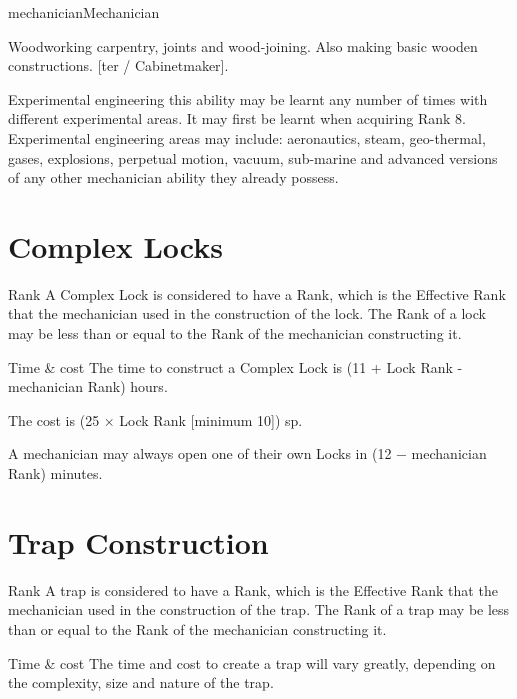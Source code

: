 \begin{Skill}[2.2]{mechanician}{Mechanician}
\begin{Description}
\item[Woodworking] carpentry, joints and wood-joining.  Also making
  basic wooden constructions. [ter / Cabinetmaker].

\item[Experimental] engineering this ability may be learnt any number
  of times with different experimental areas. It may first be learnt
  when acquiring Rank 8.  Experimental engineering areas may include:
  aeronautics, steam, geo-thermal, gases, explosions, perpetual
  motion, vacuum, sub-marine and advanced versions of any other
  mechanician ability they already possess.

  \end{Description}

\section{Complex Locks}

\begin{Description}

\item[Rank] A Complex Lock is considered to have a Rank, which is the
  Effective Rank that the mechanician used in the construction of the
  lock.  The Rank of a lock may be less than or equal to the Rank of
  the mechanician constructing it.

\item[Time \& cost] The time to construct a Complex Lock is (11 + Lock
  Rank - mechanician Rank) hours.

The cost is (25 × Lock Rank [minimum 10]) sp. 

A mechanician may always open one of their own Locks in (12 −
mechanician Rank) minutes.

\end{Description}

\section{Trap Construction}
\label{mechanician:traps}
\begin{Description}

\item[Rank] A trap is considered to have a Rank, which is the
  Effective Rank that the mechanician used in the construction of the
  trap.  The Rank of a trap may be less than or equal to the Rank of
  the mechanician constructing it.

\item[Time \& cost] The time and cost to create a trap will vary
  greatly, depending on the complexity, size and nature of the trap.


\end{Description}
\end{Skill}
